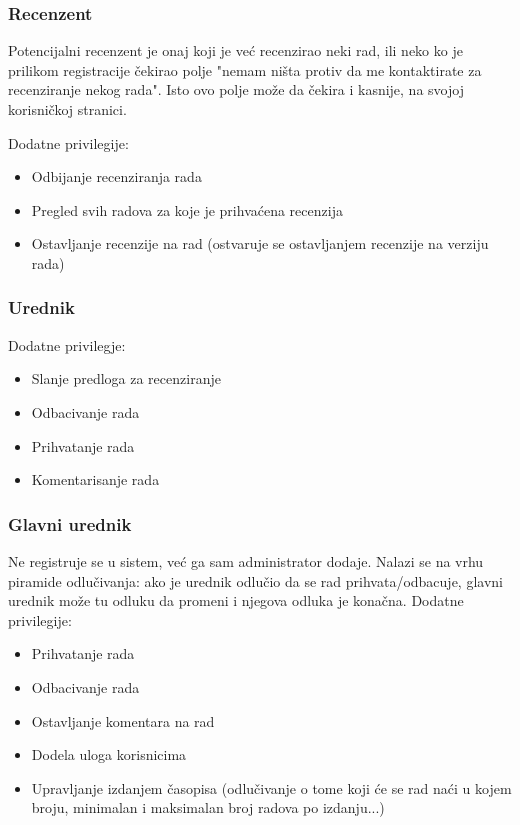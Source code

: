 \documentclass[a4paper]{article}
\begin{document}
    \subsubsection{Recenzent}
    \label{subsubsection:recenzent}
     Potencijalni recenzent je onaj koji je već recenzirao neki rad, ili  neko ko je  prilikom registracije čekirao polje "nemam ništa protiv da me kontaktirate za recenziranje nekog rada". Isto ovo polje može da čekira i kasnije, na svojoj korisničkoj stranici.
     
    Dodatne privilegije:
    \begin{itemize}
        \item Odbijanje recenziranja rada
        \item Pregled svih radova za koje je prihvaćena recenzija
        \item Ostavljanje recenzije na rad (ostvaruje se ostavljanjem recenzije na verziju rada)
    \end{itemize}
    
    \subsubsection{Urednik}
    \label{subsubsection:urednik}
    Dodatne privilegje:
    \begin{itemize}
        \item Slanje predloga za recenziranje
        \item Odbacivanje rada
        \item Prihvatanje rada
        \item Komentarisanje rada
    \end{itemize}
    
    \subsubsection{Glavni urednik}
    \label{subsubsection:glavniurednik}
    Ne registruje se u sistem, već ga sam administrator dodaje. Nalazi se na vrhu piramide odlučivanja: ako je urednik odlučio da se rad prihvata/odbacuje, glavni urednik može tu odluku da promeni i njegova odluka je konačna.
    Dodatne privilegije:
     \begin{itemize}
         \item Prihvatanje rada
         \item Odbacivanje rada
         \item Ostavljanje komentara na rad
         \item Dodela uloga korisnicima
         \item Upravljanje izdanjem časopisa (odlučivanje o tome koji će se rad naći u kojem broju, minimalan i maksimalan broj radova po izdanju...)
     \end{itemize}
    
\end{document}
